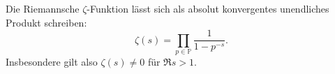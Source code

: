 \begin{frame}
    \begin{lemma}[Eulerprodukt]
        Die Riemannsche $\zeta$-Funktion lässt sich als absolut konvergentes unendliches Produkt schreiben:
    \[
        \zeta(s) = \prod_{p\in \mathbb{P}}\frac{1}{1-p^{-s}}.
    \]
    Insbesondere gilt also $\zeta(s) \neq 0$ für $\Re s > 1$.
    \end{lemma}
\end{frame}